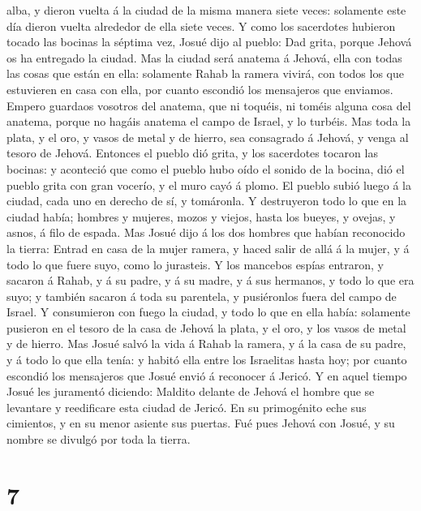 alba, y dieron vuelta á la ciudad de la misma manera siete veces:
solamente este día dieron vuelta alrededor de ella siete veces.
 Y como los sacerdotes hubieron tocado las bocinas la
séptima vez, Josué dijo al pueblo: Dad grita, porque Jehová os ha
entregado la ciudad.  Mas la ciudad será anatema á
Jehová, ella con todas las cosas que están en ella: solamente Rahab la
ramera vivirá, con todos los que estuvieren en casa con ella, por cuanto
escondió los mensajeros que enviamos.  Empero guardaos
vosotros del anatema, que ni toquéis, ni toméis alguna cosa del anatema,
porque no hagáis anatema el campo de Israel, y lo turbéis.
 Mas toda la plata, y el oro, y vasos de metal y de
hierro, sea consagrado á Jehová, y venga al tesoro de Jehová.
 Entonces el pueblo dió grita, y los sacerdotes tocaron
las bocinas: y aconteció que como el pueblo hubo oído el sonido de la
bocina, dió el pueblo grita con gran vocerío, y el muro cayó á plomo. El
pueblo subió luego á la ciudad, cada uno en derecho de sí, y tomáronla.
 Y destruyeron todo lo que en la ciudad había; hombres y
mujeres, mozos y viejos, hasta los bueyes, y ovejas, y asnos, á filo de
espada.  Mas Josué dijo á los dos hombres que habían
reconocido la tierra: Entrad en casa de la mujer ramera, y haced salir
de allá á la mujer, y á todo lo que fuere suyo, como lo jurasteis.
 Y los mancebos espías entraron, y sacaron á Rahab, y á
su padre, y á su madre, y á sus hermanos, y todo lo que era suyo; y
también sacaron á toda su parentela, y pusiéronlos fuera del campo de
Israel.  Y consumieron con fuego la ciudad, y todo lo que
en ella había: solamente pusieron en el tesoro de la casa de Jehová la
plata, y el oro, y los vasos de metal y de hierro.  Mas
Josué salvó la vida á Rahab la ramera, y á la casa de su padre, y á todo
lo que ella tenía: y habitó ella entre los Israelitas hasta hoy; por
cuanto escondió los mensajeros que Josué envió á reconocer á Jericó.
 Y en aquel tiempo Josué les juramentó diciendo: Maldito
delante de Jehová el hombre que se levantare y reedificare esta ciudad
de Jericó. En su primogénito eche sus cimientos, y en su menor asiente
sus puertas.  Fué pues Jehová con Josué, y su nombre se
divulgó por toda la tierra.

\hypertarget{section-6}{%
\section{7}\label{section-6}}

